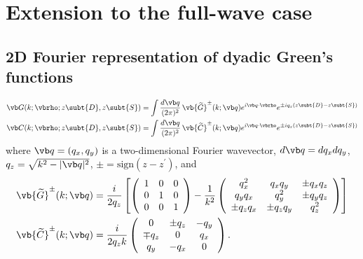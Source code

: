 \documentclass[letterpaper]{article}
\renewcommand{\wt}{\widetilde}
\begin{document}
\newpage
\section{Extension to the full-wave case}
\label{FullWaveSection}

\subsection{2D Fourier representation of dyadic Green's functions}

\begin{subequations}
\begin{align}
 \vb G(k; \vbrho; z\subt{D}, z\subt{S})
&= \int \frac{d\vb q}{(2\pi)^2}
   \,
   \vb{\wt G}^\pm (k; \vb q)
      e^{i\vb q\cdot \vbrho}
     e^{\pm iq_z(z\subt{D}-z\subt{S})}
\\
 \vb C(k; \vbrho; z\subt{D}, z\subt{S})
&=\int \frac{d\vb q}{(2\pi)^2}
  \, 
  \vb{\wt C}^\pm (k; \vb q) e^{i\vb q\cdot \vbrho}
                   e^{\pm iq_z(z\subt{D}-z\subt{S})}
\end{align}
\label{SpectralGFs}%
\end{subequations}
where $\vb q=(q_x,q_y)$ is a two-dimensional Fourier wavevector,
$d\vb q=dq_x dq_y$,
$q_z=\sqrt{k^2-|\vb q|^2}$, $\pm = \text{sign}(z-z^\prime)$,
and
\begin{align*}
 \vb{\wt G}^\pm(k; \vb q)
   &=\frac{i}{2 q_z}
     \left[
     \left(\begin{array}{ccc}
      1 & 0 & 0 \\ 
      0 & 1 & 0 \\ 
      0 & 0 & 1
     \end{array}\right)
     -\frac{1}{k^2}
     \left(\begin{array}{ccc}
      q_x^2       & q_x q_y     & \pm q_x q_z \\
      q_yq_x      & q_y^2       & \pm q_y q_z \\
      \pm q_z q_x & \pm q_z q_y & q_z^2
     \end{array}\right)\right]
\\
 \vb{\wt C}^\pm (k; \vb q)
   &=\frac{i}{2q_z k}
     \left(\begin{array}{ccc}
           0 & \pm q_z & -q_y \\
     \mp q_z &       0 &  q_x \\
         q_y &    -q_x &    0
     \end{array}\right).
\end{align*}
\end{document}
